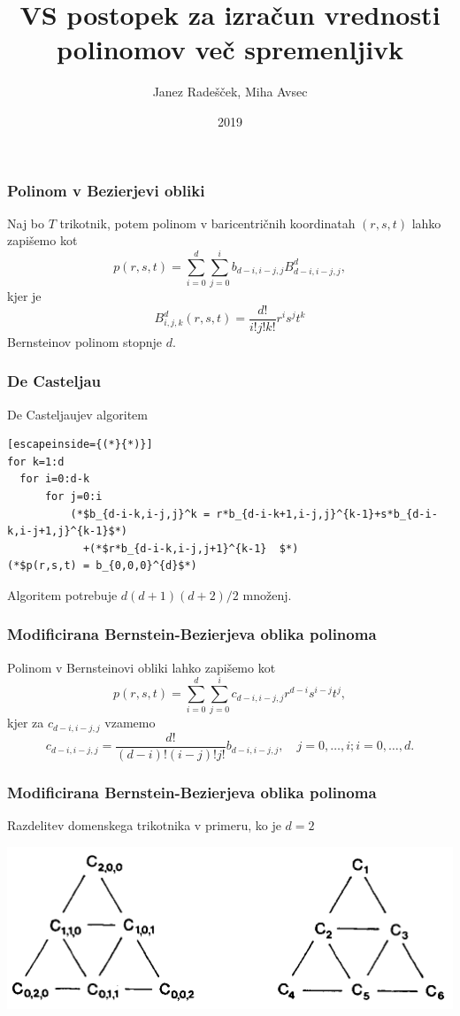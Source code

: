 \documentclass{beamer}
\title{VS postopek za izračun vrednosti polinomov več spremenljivk}
\author{Janez Radešček, Miha Avsec}
\institute{Fakulteta za matematiko in fiziko}
\date{2019}
\begin{document}
 
\frame{\titlepage}

\begin{frame}
\frametitle{Polinom v Bezierjevi obliki}
Naj bo $T$ trikotnik, potem polinom v baricentričnih koordinatah $(r,s,t)$ lahko zapišemo kot
$$p(r,s,t) = \sum_{i=0}^{d}\sum_{j=0}^{i}b_{d-i,i-j,j}B_{d-i,i-j,j}^{d},$$
kjer je
$$B_{i,j,k}^{d}(r,s,t) = \frac{d!}{i!j!k!}r^is^jt^k$$
Bernsteinov polinom stopnje $d$.

\end{frame}

\begin{frame}[fragile]
\frametitle{De Casteljau}
\begin{block}{De Casteljaujev algoritem}
\begin{lstlisting}[escapeinside={(*}{*)}]
for k=1:d
  for i=0:d-k
      for j=0:i
          (*$b_{d-i-k,i-j,j}^k = r*b_{d-i-k+1,i-j,j}^{k-1}+s*b_{d-i-k,i-j+1,j}^{k-1}$*) 
          	+(*$r*b_{d-i-k,i-j,j+1}^{k-1}  $*)
(*$p(r,s,t) = b_{0,0,0}^{d}$*)
\end{lstlisting}
\end{block}
Algoritem potrebuje $d(d+1)(d+2)/2$ množenj.
\end{frame}



\begin{frame}
\frametitle{Modificirana Bernstein-Bezierjeva oblika polinoma}
Polinom v Bernsteinovi obliki lahko zapišemo kot
$$p(r,s,t) = \sum_{i=0}^{d}\sum_{j=0}^{i}c_{d-i,i-j,j}r^{d-i}s^{i-j}t^j,$$
kjer za $c_{d-i,i-j,j}$ vzamemo
$$c_{d-i,i-j,j} = \frac{d!}{(d-i)!(i-j)!j!}b_{d-i,i-j,j}, \quad j=0,\ldots, i; i = 0,\ldots,d.$$
\end{frame}


\begin{frame}
\frametitle{Modificirana Bernstein-Bezierjeva oblika polinoma}
Razdelitev domenskega trikotnika v primeru, ko je $d=2$
\begin{center}
\includegraphics[width=.9\linewidth]{graf.png}
\end{center}

\end{frame}
\end{document}

